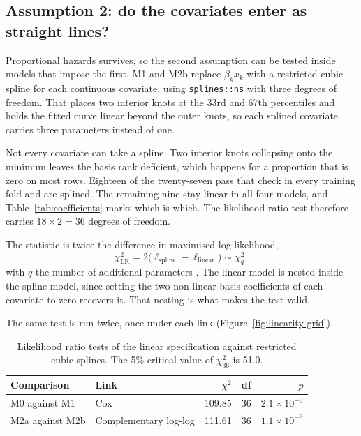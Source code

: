 \subsection{Assumption 2: do the covariates enter as straight lines?}
\label{subsec:res-linearity}
 
Proportional hazards survives, so the second assumption can be tested inside models that impose the first. M1 and M2b replace $\beta_k x_k$ with a restricted cubic spline for each continuous covariate, using \texttt{splines::ns} with three degrees of freedom. That places two interior knots at the 33rd and 67th percentiles and holds the fitted curve linear beyond the outer knots, so each splined covariate carries three parameters instead of one.
 
Not every covariate can take a spline. Two interior knots collapsing onto the minimum leaves the basis rank deficient, which happens for a proportion that is zero on most rows. Eighteen of the twenty-seven pass that check in every training fold and are splined. The remaining nine stay linear in all four models, and Table~\ref{tab:coefficients} marks which is which. The likelihood ratio test therefore carries $18 \times 2 = 36$ degrees of freedom.
 
The statistic is twice the difference in maximised log-likelihood,
%
\begin{equation}
\chi^2_{\text{LR}} = 2\big(\ell_{\text{spline}} - \ell_{\text{linear}}\big) \sim \chi^2_{q},
\label{eq:lr-statistic}
\end{equation}
%
with $q$ the number of additional parameters \parencite{wilks1938}. The linear model is nested inside the spline model, since setting the two non-linear basis coefficients of each covariate to zero recovers it. That nesting is what makes the test valid.
 
The same test is run twice, once under each link (Figure~\ref{fig:linearity-grid}).
 
\begin{table}[htbp]
\centering
\small
\begin{tabular}{@{}llrrr@{}}
\toprule
Comparison & Link & $\chi^2$ & df & $p$ \\
\midrule
M0 against M1   & Cox                   & 109.85 & 36 & $2.1\times10^{-9}$ \\
M2a against M2b & Complementary log-log & 111.61 & 36 & $1.1\times10^{-9}$ \\
\bottomrule
\end{tabular}
\caption{Likelihood ratio tests of the linear specification against restricted cubic splines. The 5\% critical value of $\chi^2_{36}$ is 51.0.}
\label{tab:lrt}
\end{table}
 
